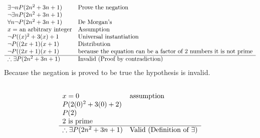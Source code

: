 \documentclass[letterpaper]{article}
\begin{document}
	\section{}
    	\subsection{}
        	\begin{displaymath}
        		\begin{array}{ll}
        			\exists \neg n P(2n^2 + 3n + 1) & $Prove the negation$\\
                    \neg \exists n P(2n^2 + 3n + 1) & \\
                  	\forall n \neg P(2n^2 + 3n + 1) & $De Morgan's$\\
                    x = $ an arbitrary integer$ & $Assumption$\\
                    \neg P((x)^2 + 3(x) + 1 & $Universal instantiation$\\
                    \neg P((2x + 1)(x + 1) & $Distribution$\\
					\neg P((2x + 1)(x + 1) & $because the equation can be a factor of 2 numbers it is not prime$\\
                    \hline
                    \therefore \exists P(2n^2 + 3n + 1) & $Invalid (Proof by contradiction)$\\
        		\end{array}
        	\end{displaymath}
            Because the negation is proved to be true the hypothesis is invalid.
		\subsection{}
        	\begin{displaymath}
            	\begin{array}{ll}
            		x = 0 & $assumption$\\
                    P(2(0)^2 + 3(0) + 2) &\\
                    P(2) &\\
                    2 $ is prime$ & \\
                    \hline
                    \therefore \exists P(2n^2 + 3n + 1) & $Valid (Definition of $\exists$)$\\
            	\end{array}
        	\end{displaymath}
\end{document}
